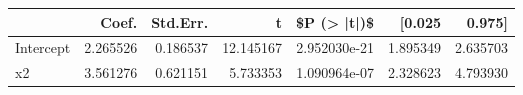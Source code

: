 \begin{tabular}{lrrrrrr}
\toprule
{} &     Coef. &  Std.Err. &          t &   \$P (> |t|)\$ &    [0.025 &    0.975] \\
\midrule
Intercept &  2.265526 &  0.186537 &  12.145167 &  2.952030e-21 &  1.895349 &  2.635703 \\
x2        &  3.561276 &  0.621151 &   5.733353 &  1.090964e-07 &  2.328623 &  4.793930 \\
\bottomrule
\end{tabular}
